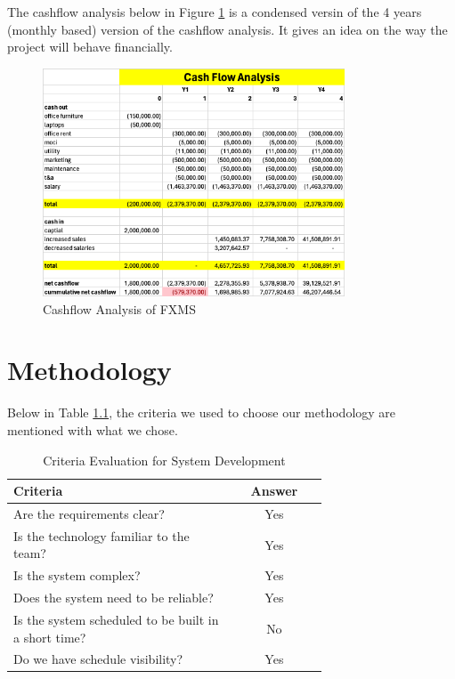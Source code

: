 \documentclass[a4paper]{report}
\begin{document}
The cashflow analysis below in Figure \ref{fig:cash-flow-analysis} is a condensed versin of the 4 years (monthly based) version of the cashflow analysis. It gives an idea on the way the project will behave financially.

\begin{figure}[h!]
    \centering
    \includegraphics[width=0.8\textwidth]{images/cash-flow-analysis.png}
    \caption{Cashflow Analysis of FXMS}
    \label{fig:cash-flow-analysis}
\end{figure}

\chapter{Methodology}

Below in Table \ref{tab:methodology-criteria}, the criteria we used to choose our methodology are mentioned with what we chose. 

\begin{table}[htbp]
    \centering
    \caption{Criteria Evaluation for System Development}
    \label{tab:methodology-criteria}
    \begin{tabular}{@{}p{0.7\linewidth}c@{}}
        \toprule
        Criteria & Answer \\
        \midrule
        Are the requirements clear? & Yes \\
        Is the technology familiar to the team? & Yes \\
        Is the system complex? & Yes \\
        Does the system need to be reliable? & Yes \\
        Is the system scheduled to be built in a short time? & No \\
        Do we have schedule visibility? & Yes \\
        \bottomrule
    \end{tabular}
\end{table}
\end{document}
